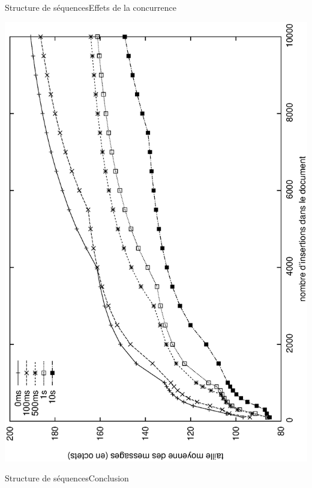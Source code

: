 \begin{frame}{Structure de séquences}{Effets de la concurrence}
  \vspace{-0.5cm}
  \begin{center}
    \includegraphics[angle=-90, width=\textwidth]{img/replication/latency.eps}
  \end{center}
\end{frame}

\begin{frame}{Structure de séquences}{Conclusion}


\end{frame}



